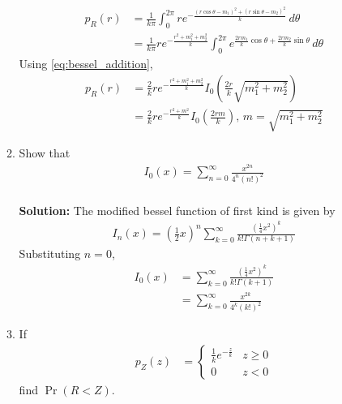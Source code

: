 \documentclass[journal,8pt,onecolumn]{IEEEtran}
\providecommand{\pr}[1]{\ensuremath{\Pr\left(#1\right)}}
\providecommand{\brak}[1]{\ensuremath{\left(#1\right)}}
\newcommand{\solution}{\noindent \textbf{Solution: }}
\begin{document}
\begin{enumerate}
\begin{enumerate}[label=(\alph{enumii})]
\begin{align}
	p_{R}\brak{r} &= \frac{1}{k\pi} \int_{0}^{2\pi} re^{-\frac{\brak{r\cos \theta-m_1}^2+\brak{r\sin \theta-m_2}^2}{k}} \,d\theta\\ 
	&= \frac{1}{k\pi}re^{-\frac{r^2+m_1^2+m_2^2}{k}} \int_{0}^{2\pi} e^{\frac{2r m_1}{k}\cos \theta + \frac{2r m_2}{k}\sin \theta} \,d\theta
\end{align}
Using \eqref{eq:bessel_addition},
\begin{align}
	p_{R}\brak{r} &= \frac{2}{k}re^{-\frac{r^2+m_1^2+m_2^2}{k}}I_{0}\brak{\frac{2r}{k}\sqrt{m_1^2+m_2^2}}\\
	&= \frac{2}{k}re^{-\frac{r^2+m^2}{k}}I_{0}\brak{\frac{2rm}{k}} \text{, $m=\sqrt{m_1^2+m_2^2}$}
\end{align}
%
\item
Show that
\begin{align}
I_0(x) = \sum_{n=0}^{\infty}\frac{x^{2n}}{4^n\brak{n!}^2}
\end{align}\\
\solution The modified bessel function of first kind is given by
\begin{align}
	\label{eq:mod_bessel_eq_series}
	I_{n}\brak{x} = \brak{\frac{1}{2}x}^n \sum_{k=0}^{\infty} \frac{\brak{\frac{1}{4}x^2}^k}{k!\Gamma\brak{n+k+1}}
\end{align}
Substituting $n=0$,
\begin{align}
	I_{0}\brak{x} &= \sum_{k=0}^{\infty} \frac{\brak{\frac{1}{4}x^2}^k}{k!\Gamma\brak{k+1}}\\
	&= \sum_{k=0}^{\infty} \frac{x^{2k}}{4^k\brak{k!}^2}
\end{align}
\item 
If
%
\begin{align}
p_{Z}(z) &= 
\begin{cases}
\frac{1}{k} e^{-\frac{z}{k}} & z \geq 0 \\
0 & z < 0
\end{cases}
\end{align}
%
find $\pr{R < Z}$.
\end{enumerate}
\end{enumerate}
\end{document}
